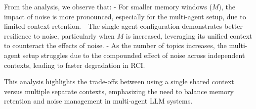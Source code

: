 \documentclass{article}
\begin{document}
From the analysis, we observe that:
- For smaller memory windows (\( M \)), the impact of noise is more pronounced, especially for the multi-agent setup, due to limited context retention.
- The single-agent configuration demonstrates better resilience to noise, particularly when \( M \) is increased, leveraging its unified context to counteract the effects of noise.
- As the number of topics increases, the multi-agent setup struggles due to the compounded effect of noise across independent contexts, leading to faster degradation in RCI.

This analysis highlights the trade-offs between using a single shared context versus multiple separate contexts, emphasizing the need to balance memory retention and noise management in multi-agent LLM systems.


\end{document}
